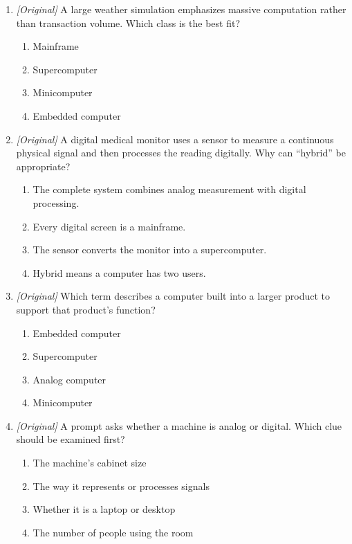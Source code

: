 \begin{enumerate}[label=\textbf{Q\arabic*.}, leftmargin=*]
\begin{enumerate}[label=\Alph*.]
    \item One extremely large weather simulation
    \item Many concurrent users completing transactions
    \item A controller embedded in a washing machine
    \item A single user's laptop form factor
  \end{enumerate}
\item \textit{[Original]} A large weather simulation emphasizes massive
  computation rather than transaction volume. Which class is the best fit?
  \begin{enumerate}[label=\Alph*.]
    \item Mainframe
    \item Supercomputer
    \item Minicomputer
    \item Embedded computer
  \end{enumerate}
\item \textit{[Original]} A digital medical monitor uses a sensor to
  measure a continuous physical signal and then processes the reading
  digitally. Why can ``hybrid'' be appropriate?
  \begin{enumerate}[label=\Alph*.]
    \item The complete system combines analog measurement with digital
      processing.
    \item Every digital screen is a mainframe.
    \item The sensor converts the monitor into a supercomputer.
    \item Hybrid means a computer has two users.
  \end{enumerate}
\item \textit{[Original]} Which term describes a computer built into a larger
  product to support that product's function?
  \begin{enumerate}[label=\Alph*.]
    \item Embedded computer
    \item Supercomputer
    \item Analog computer
    \item Minicomputer
  \end{enumerate}
\item \textit{[Original]} A prompt asks whether a machine is analog or
  digital. Which clue should be examined first?
  \begin{enumerate}[label=\Alph*.]
    \item The machine's cabinet size
    \item The way it represents or processes signals
    \item Whether it is a laptop or desktop
    \item The number of people using the room
  \end{enumerate}


\end{enumerate}
